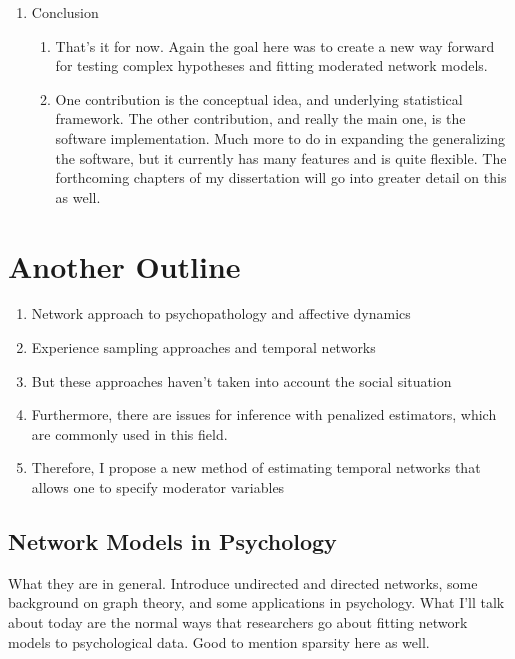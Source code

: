 \begin{enumerate}
\begin{enumerate}
    \end{enumerate}
    \item Conclusion
    \begin{enumerate}
        \item That's it for now. Again the goal here was to create a new way forward for testing complex hypotheses and fitting moderated network models. 
        \item One contribution is the conceptual idea, and underlying statistical framework. The other contribution, and really the main one, is the software implementation. Much more to do in expanding the generalizing the software, but it currently has many features and is quite flexible. The forthcoming chapters of my dissertation will go into greater detail on this as well. 
    \end{enumerate}
\end{enumerate}


\chapter{Another Outline}
\begin{enumerate}
    \item Network approach to psychopathology and affective dynamics
    \item Experience sampling approaches and temporal networks
    \item But these approaches haven't taken into account the social situation
    \item Furthermore, there are issues for inference with penalized estimators, which are commonly used in this field.
    \item Therefore, I propose a new method of estimating temporal networks that allows one to specify moderator variables
\end{enumerate}

\section{Network Models in Psychology}
What they are in general. Introduce undirected and directed networks, some background on graph theory, and some applications in psychology. What I'll talk about today are the normal ways that researchers go about fitting network models to psychological data. Good to mention sparsity here as well.

